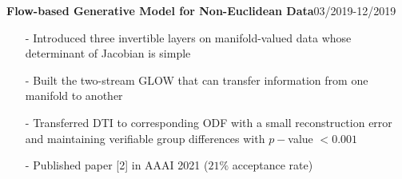 \documentclass[margin]{res}
\begin{document}
\begin{resume}
                 \vspace{-1em}  

                \textbf{Flow-based Generative Model for Non-Euclidean Data}\hfill 03/2019-12/2019
                \begin{itemize}\itemsep -2.2pt %
                 \item[-] Introduced three invertible layers on manifold-valued data whose determinant of Jacobian is simple
                 \item[-] Built the two-stream GLOW that can transfer information from one manifold to another
                 \item[-] Transferred DTI to corresponding ODF with a small reconstruction error and maintaining verifiable group differences with $p-$value $<0.001$
				\item[-] Published paper [2] in AAAI 2021 ($21\%$ acceptance rate)
                 \end{itemize}

                 \vspace{-1em}  



\end{resume}
\end{document}
